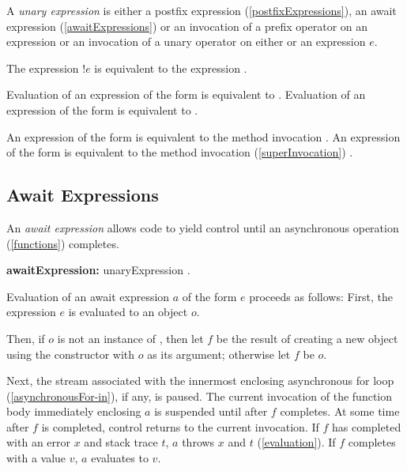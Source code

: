 \documentclass{article}
\begin{document}
\LMHash{}
A {\em unary expression} is either a postfix expression (\ref{postfixExpressions}), an await expression (\ref{awaitExpressions}) or an invocation of a prefix operator on an expression or an invocation of a unary operator on either \SUPER{} or an expression $e$.

\LMHash{}
The expression $!e$ is equivalent to the expression .

\LMHash{}
Evaluation of an expression of the form  is equivalent to .
Evaluation of an expression of the form  is equivalent to .


\LMHash{}
An expression of the form  is equivalent to the method invocation .
An expression of the form  is equivalent to the method invocation (\ref{superInvocation}) .


\subsection{Await Expressions}

\LMHash{}
An {\em await expression} allows code to yield control until an asynchronous operation (\ref{functions}) completes.

\begin{grammar}
{\bf awaitExpression:}\AWAIT{} unaryExpression
  .
\end{grammar}

\LMHash{}
Evaluation of an await expression $a$ of the form \AWAIT{} $e$ proceeds as follows:
First, the expression $e$ is evaluated to an object $o$.

\LMHash{}
Then, if $o$ is not an instance of , then let $f$ be the result of creating a new object using the constructor  with $o$ as its argument; otherwise let $f$ be $o$.

\LMHash{}
Next, the stream associated with the innermost enclosing asynchronous for loop (\ref{asynchronousFor-in}), if any, is paused.
The current invocation of the function body immediately enclosing $a$ is suspended until after $f$ completes.
At some time after $f$ is completed, control returns to the current invocation.
If $f$ has completed with an error $x$ and stack trace $t$, $a$ throws $x$ and $t$ (\ref{evaluation}).
If $f$ completes with a value $v$, $a$ evaluates to $v$.
\end{document}
